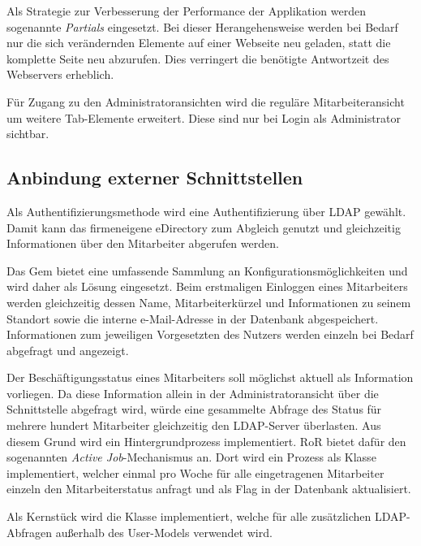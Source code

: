 
Als Strategie zur Verbesserung der Performance der Applikation werden sogenannte
\textit{Partials} eingesetzt. Bei dieser Herangehensweise werden bei Bedarf nur die sich
verändernden Elemente auf einer Webseite neu geladen, statt die komplette Seite neu abzurufen.
Dies verringert die benötigte Antwortzeit des Webservers erheblich.

Für Zugang zu den Administratoransichten wird die reguläre Mitarbeiteransicht um weitere Tab-Elemente
erweitert. Diese sind nur bei Login als Administrator sichtbar.

\subsection{Anbindung externer Schnittstellen}
\label{sec:Anbindung externer Schnittstellen}
Als Authentifizierungsmethode wird eine Authentifizierung über \acs{LDAP} gewählt. Damit
kann das firmeneigene eDirectory zum Abgleich genutzt und gleichzeitig Informationen über
den Mitarbeiter abgerufen werden.

Das Gem  bietet eine umfassende Sammlung an Konfigurationsmöglichkeiten und wird
daher als Lösung eingesetzt. Beim erstmaligen Einloggen eines Mitarbeiters werden gleichzeitig
dessen Name, Mitarbeiterkürzel und Informationen zu seinem Standort sowie die interne
e-Mail-Adresse in der Datenbank abgespeichert. Informationen zum jeweiligen Vorgesetzten des
Nutzers werden einzeln bei Bedarf abgefragt und angezeigt.

Der Beschäftigungsstatus eines Mitarbeiters soll möglichst aktuell als Information vorliegen. Da diese
Information allein in der Administratoransicht \bzw über die Schnittstelle abgefragt wird,
würde eine gesammelte Abfrage des Status für mehrere hundert Mitarbeiter gleichzeitig den LDAP-Server
überlasten. Aus diesem Grund wird ein Hintergrundprozess implementiert. RoR bietet dafür den
sogenannten \textit{Active Job}-Mechanismus an. Dort wird ein Prozess als Klasse implementiert,
welcher einmal pro Woche für alle eingetragenen Mitarbeiter einzeln den Mitarbeiterstatus anfragt
und als Flag in der Datenbank aktualisiert.


Als Kernstück wird die Klasse  implementiert, welche für alle zusätzlichen
LDAP-Abfragen außerhalb des User-Models verwendet wird.

